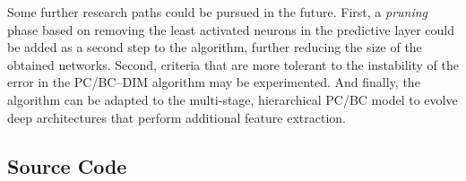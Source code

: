 \documentclass[11pt,a4paper]{report}
\begin{document}
		Some further research paths could be pursued in the future. First, a \emph{pruning} phase based on removing the least activated neurons in the predictive layer could be added as a second step to the algorithm, further reducing the size of the obtained networks. Second, criteria that are more tolerant to the instability of the error in the PC/BC--DIM algorithm may be experimented. And finally, the algorithm can be adapted to the multi-stage, hierarchical PC/BC model to evolve deep architectures that perform additional feature extraction. 
	
	
	
	\nocite{*}
	
	\begin{appendices}
		\chapter{Source Code}
	\end{appendices}
\end{document}
